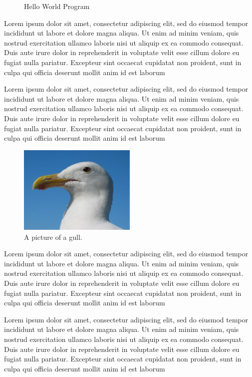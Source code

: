 \begin{figure}[!ht]
\centering
{}
\caption{Hello World Program}\label{figure:helloworld}
\end{figure}
Lorem ipsum dolor sit amet, consectetur adipiscing elit, sed do eiusmod tempor incididunt ut labore et dolore magna aliqua. Ut enim ad minim veniam, quis nostrud exercitation ullamco laboris nisi ut aliquip ex ea commodo consequat. Duis aute irure dolor in reprehenderit in voluptate velit esse cillum dolore eu fugiat nulla pariatur. Excepteur sint occaecat cupidatat non proident, sunt in culpa qui officia deserunt mollit anim id est laborum

Lorem ipsum dolor sit amet, consectetur adipiscing elit, sed do eiusmod tempor incididunt ut labore et dolore magna aliqua. Ut enim ad minim veniam, quis nostrud exercitation ullamco laboris nisi ut aliquip ex ea commodo consequat. Duis aute irure dolor in reprehenderit in voluptate velit esse cillum dolore eu fugiat nulla pariatur. Excepteur sint occaecat cupidatat non proident, sunt in culpa qui officia deserunt mollit anim id est laborum~\cite{GorillaArm}

\begin{figure}[!ht] %
  \centering
  \includegraphics[width=0.5\textwidth]{images/gull.png}
  \caption{A picture of a gull.}
\end{figure}

Lorem ipsum dolor sit amet, consectetur adipiscing elit, sed do eiusmod tempor incididunt ut labore et dolore magna aliqua. Ut enim ad minim veniam, quis nostrud exercitation ullamco laboris nisi ut aliquip ex ea commodo consequat. Duis aute irure dolor in reprehenderit in voluptate velit esse cillum dolore eu fugiat nulla pariatur. Excepteur sint occaecat cupidatat non proident, sunt in culpa qui officia deserunt mollit anim id est laborum

Lorem ipsum dolor sit amet, consectetur adipiscing elit, sed do eiusmod tempor incididunt ut labore et dolore magna aliqua. Ut enim ad minim veniam, quis nostrud exercitation ullamco laboris nisi ut aliquip ex ea commodo consequat. Duis aute irure dolor in reprehenderit in voluptate velit esse cillum dolore eu fugiat nulla pariatur. Excepteur sint occaecat cupidatat non proident, sunt in culpa qui officia deserunt mollit anim id est laborum

